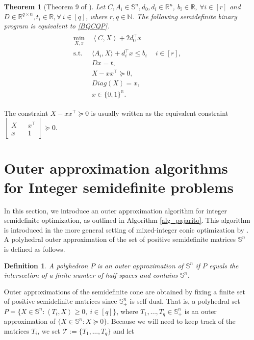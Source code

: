 \documentclass{article}
\newtheorem{theorem}{Theorem}
\newtheorem{definition}{Definition}
\begin{document}
\begin{theorem}[Theorem 9 of \cite{de2023integrality}]
Let $C,A_i \in \mathbb{S}^n, d_0,d_i \in \mathbb{R}^n$, $b_i \in \mathbb{R}, \ \forall i \in [r]$ and $D \in \mathbb{R}^{q \times n }, t_i \in \mathbb{R}, \forall \ i \in [q]$, where $r,q \in \mathbb{N}$. The following semidefinite binary program is equivalent to \eqref{BQCQP}.
\begin{gather}\label{BSDP}\tag{BSDP}
\begin{aligned}
\min_{X, x } \ & \left \langle C,X \right \rangle + 2d_0^\top x \\
\text{s.t.} \ & \langle A_i,X \rangle + d_i^\top x \leq b_i \quad  \ i \in [r], \\
& D x  = t, \\
& X-xx^\top \succeq 0, \\
& Diag(X)=x, \\
& x \in \{0,1\}^n.
\end{aligned}
\end{gather}
    
\end{theorem}

The constraint $X-xx^\top \succeq 0$ is usually written as the equivalent constraint $\begin{bmatrix} X &  & x^\top  \\ x & & 1\end{bmatrix} \succeq  0$.



\section{Outer approximation algorithms for Integer semidefinite problems}\label{oa_sec:2}


In this section, we introduce an outer approximation algorithm for integer semidefinite optimization, as outlined in Algorithm \ref{alg_pajarito}. This algorithm is introduced in the more general setting of mixed-integer conic optimization by
 \citet{lubin2018polyhedral}. A polyhedral outer approximation of the set of positive semidefinite matrices $\mathbb{S}^n$ is defined as follows.

\begin{definition}
    A polyhedron $P$ is an outer approximation of $\mathbb{S}^n$ if $P$ equals the intersection of a finite number of half-spaces and contains $\mathbb{S}^n$.
\end{definition}

Outer approximations of the semidefinite cone are obtained by fixing a finite set of positive semidefinite matrices since $\mathbb{S}^n_+$ is self-dual. That is, a polyhedral set $P = \{X \in \mathbb{S}^n : \left \langle T_i, X \right \rangle \geq 0 ,\  i \in [q] \}$, where $T_1,\dots, T_q \in \mathbb{S}^n_+$ is an outer approximation of $\{X \in \mathbb{S}^n : X \succeq 0\}$. Because we will need to keep track of the matrices $T_i$, we set $\mathcal{T}:= \{T_1,\dots,T_q\}$ and let
\end{document}
